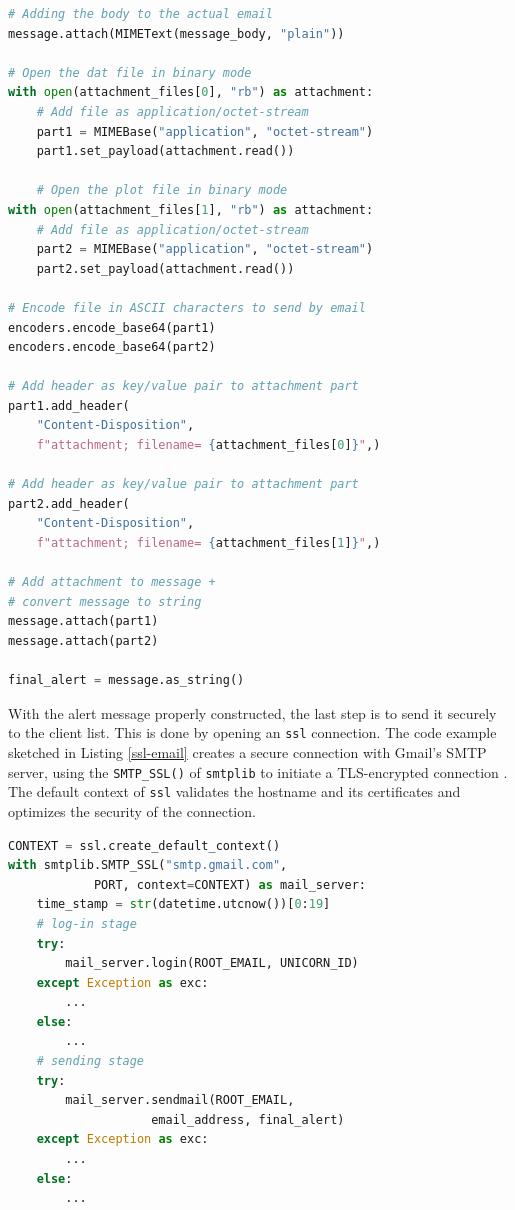 \documentclass[conference]{IEEEtran}
\begin{document}
\begin{lstlisting}[language=Python, caption={Create attachments and save them securely by encoding them and embed them as string objects within the final object.},basicstyle=\footnotesize,label={create-email}]
# Adding the body to the actual email
message.attach(MIMEText(message_body, "plain"))

# Open the dat file in binary mode
with open(attachment_files[0], "rb") as attachment:
    # Add file as application/octet-stream
    part1 = MIMEBase("application", "octet-stream")
    part1.set_payload(attachment.read())

    # Open the plot file in binary mode
with open(attachment_files[1], "rb") as attachment:
    # Add file as application/octet-stream
    part2 = MIMEBase("application", "octet-stream")
    part2.set_payload(attachment.read())

# Encode file in ASCII characters to send by email
encoders.encode_base64(part1)
encoders.encode_base64(part2)

# Add header as key/value pair to attachment part
part1.add_header(
    "Content-Disposition",
    f"attachment; filename= {attachment_files[0]}",)

# Add header as key/value pair to attachment part
part2.add_header(
    "Content-Disposition",
    f"attachment; filename= {attachment_files[1]}",)

# Add attachment to message +
# convert message to string
message.attach(part1)
message.attach(part2)

final_alert = message.as_string()
\end{lstlisting}

With the alert message properly constructed, the last step is to send it securely to the client list. This is done by opening an \texttt{ssl} connection. The code example sketched in Listing \ref{ssl-email} creates a secure connection with Gmail’s SMTP server, using the \texttt{SMTP\_SSL()} of \texttt{smtplib} to initiate a TLS-encrypted connection \cite{emails}. The default context of \texttt{ssl} validates the hostname and its certificates and optimizes the security of the connection.

\begin{lstlisting}[language=Python, caption={Procedure for sending the e-mail securely, through \textit{ssl}. The dotted code-base marks some debug steps that are irrelevant to the current discussion.},basicstyle=\footnotesize,label={ssl-email}]
CONTEXT = ssl.create_default_context()
with smtplib.SMTP_SSL("smtp.gmail.com", 
            PORT, context=CONTEXT) as mail_server:
    time_stamp = str(datetime.utcnow())[0:19]
    # log-in stage
    try:
        mail_server.login(ROOT_EMAIL, UNICORN_ID)
    except Exception as exc:
        ...
    else:
        ...
    # sending stage
    try:
        mail_server.sendmail(ROOT_EMAIL, 
                    email_address, final_alert)
    except Exception as exc:
        ...
    else:
        ...
\end{lstlisting}
\end{document}
